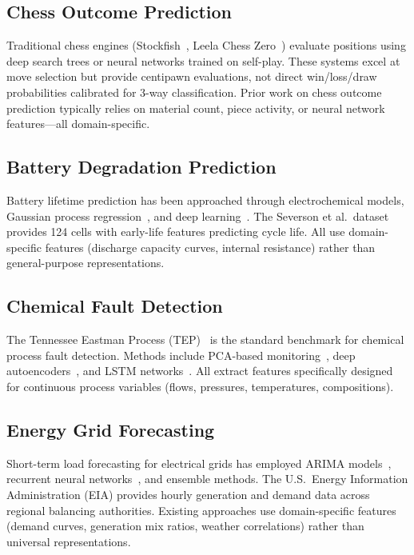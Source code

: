 \documentclass[11pt,a4paper]{article}
\begin{document}
\subsection{Chess Outcome Prediction}
Traditional chess engines (Stockfish~\citep{stockfish2024}, Leela Chess Zero~\citep{deepchess2016})
evaluate positions using deep search trees or neural networks trained on self-play.
These systems excel at move selection but provide centipawn evaluations, not direct
win/loss/draw probabilities calibrated for 3-way classification. Prior work on chess
outcome prediction typically relies on material count, piece activity, or neural
network features---all domain-specific.

\subsection{Battery Degradation Prediction}
Battery lifetime prediction has been approached through electrochemical models,
Gaussian process regression~\citep{richardson2017}, and deep learning~\citep{zhang2018battery,deng2022}.
The Severson et al.\ dataset~\citep{severson2019} provides 124 cells with early-life
features predicting cycle life. All use domain-specific features (discharge capacity
curves, internal resistance) rather than general-purpose representations.

\subsection{Chemical Fault Detection}
The Tennessee Eastman Process (TEP)~\citep{downs1993} is the standard benchmark for
chemical process fault detection. Methods include PCA-based monitoring~\citep{chiang2000},
deep autoencoders~\citep{zhang2017deep}, and LSTM networks~\citep{wu2018deep}. All
extract features specifically designed for continuous process variables (flows,
pressures, temperatures, compositions).

\subsection{Energy Grid Forecasting}
Short-term load forecasting for electrical grids has employed ARIMA
models~\citep{hong2016}, recurrent neural networks~\citep{shi2018deep}, and ensemble
methods. The U.S.\ Energy Information Administration (EIA) provides hourly generation
and demand data across regional balancing authorities. Existing approaches use
domain-specific features (demand curves, generation mix ratios, weather correlations)
rather than universal representations.
\end{document}
